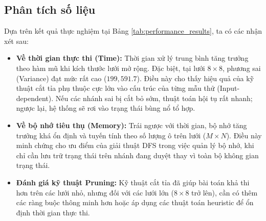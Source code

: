 \documentclass[12pt,a4paper]{article}
\begin{document}
\begin{table}[H]
\centering
\caption{Kết quả đo lường hiệu năng của thuật toán DFS với Pruning}
\label{tab:performance_results}
\end{table}

\subsection{Phân tích số liệu}
Dựa trên kết quả thực nghiệm tại Bảng \ref{tab:performance_results}, ta có các nhận xét sau:

\begin{itemize}
    \item \textbf{Về thời gian thực thi (Time):} Thời gian xử lý trung bình tăng trưởng theo hàm mũ khi kích thước lưới mở rộng. Đặc biệt, tại lưới $8 \times 8$, phương sai (Variance) đạt mức rất cao ($199,591.7$). Điều này cho thấy hiệu quả của kỹ thuật cắt tỉa phụ thuộc cực lớn vào cấu trúc của từng mẫu thử (Input-dependent). Nếu các nhánh sai bị cắt bỏ sớm, thuật toán hội tụ rất nhanh; ngược lại, hệ thống sẽ rơi vào trạng thái bùng nổ tổ hợp.
    
    \item \textbf{Về bộ nhớ tiêu thụ (Memory):} Trái ngược với thời gian, bộ nhớ tăng trưởng khá ổn định và tuyến tính theo số lượng ô trên lưới ($M \times N$). Điều này minh chứng cho ưu điểm của giải thuật DFS trong việc quản lý bộ nhớ, khi chỉ cần lưu trữ trạng thái trên nhánh đang duyệt thay vì toàn bộ không gian trạng thái.
    
    \item \textbf{Đánh giá kỹ thuật Pruning:} Kỹ thuật cắt tỉa đã giúp bài toán khả thi hơn trên các lưới nhỏ, nhưng đối với các lưới lớn ($8 \times 8$ trở lên), cần có thêm các ràng buộc thông minh hơn hoặc áp dụng các thuật toán heuristic để ổn định thời gian thực thi.
\end{itemize}
\end{document}
